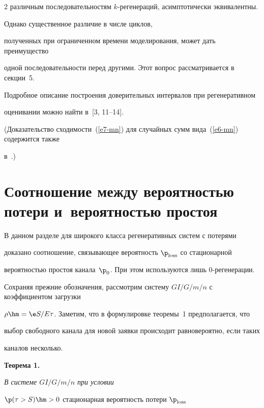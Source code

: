 \begin{multicols}{2}
различным последовательностям $k$-ре\-ге\-не\-ра\-ций, асимптотически эквивалентны.


 Однако существенное различие в числе цик\-лов,


полученных при ограниченном времени моделирования, может  дать преимущество


одной последовательности перед другими.  Этот вопрос рассматривается в секции~5. 


Подробное описание построения доверительных интервалов при регенеративном


оценивании можно   найти в~[3, 11--14]. %


 (Доказательство сходимости~(\ref{e7-mn}) для случайных сумм вида~(\ref{e6-mn}) содержится также  


 в~\cite{Asmus, Billingsley}.)





\section{Соотношение между вероятностью потери и~вероятностью простоя}





В данном разделе для широкого класса регенеративных систем с потерями


доказано соотношение, связывающее вероятность $\p_{\mathrm{loss}}$ со стационарной


вероятностью простоя канала~$\p_0$. При этом используются лишь  0-ре\-ге\-не\-ра\-ции.


 Сохраняя  прежние обозначения,  рассмотрим сис\-те\-му $GI/G/m/n$ с коэффициентом  загрузки


$\rho\hm=\e S/E\tau$. Заметим, что в формулировке теоремы~1 предполагается, что


выбор свободного канала для новой заявки происходит равновероятно, если таких


каналов несколько.





\medskip





\noindent


\textbf{Теорема 1.}  {\it В системе $GI/G/m/n$  при условии


$\p(\tau>S)\hm>0$ стационарная вероятность потери $\p_{\mathrm{loss}}$


}
\end{multicols}
